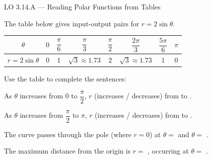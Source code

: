 \documentclass[10pt]{article}
\begin{document}
\begin{notesbox}{LO 3.14.A --- Reading Polar Functions from Tables}

The table below gives input-output pairs for $r = 2\sin\theta$.

\vspace{4pt}
\renewcommand{\arraystretch}{1.5}
\begin{tabular}{|c|c|c|c|c|c|c|c|}
\hline
$\theta$ & $0$ & $\dfrac{\pi}{6}$ & $\dfrac{\pi}{3}$ & $\dfrac{\pi}{2}$ &
           $\dfrac{2\pi}{3}$ & $\dfrac{5\pi}{6}$ & $\pi$ \\
\hline
$r = 2\sin\theta$ & $0$ & $1$ & $\sqrt{3} \approx 1.73$ & $2$ &
                   $\sqrt{3} \approx 1.73$ & $1$ & $0$ \\
\hline
\end{tabular}

\vspace{8pt}
Use the table to complete the sentences:

\vspace{4pt}
As $\theta$ increases from $0$ to $\dfrac{\pi}{2}$, $r$
\underline{\hspace{2.5cm}} (increases / decreases) from
\underline{\hspace{0.8cm}} to \underline{\hspace{0.8cm}}.

\vspace{4pt}
As $\theta$ increases from $\dfrac{\pi}{2}$ to $\pi$, $r$
\underline{\hspace{2.5cm}} (increases / decreases) from
\underline{\hspace{0.8cm}} to \underline{\hspace{0.8cm}}.

\vspace{4pt}
The curve passes through the pole (where $r = 0$) at $\theta = $
\underline{\hspace{1cm}} and $\theta = $ \underline{\hspace{1cm}}.

\vspace{4pt}
The maximum distance from the origin is $r = $ \underline{\hspace{1cm}},
occurring at $\theta = $ \underline{\hspace{1.5cm}}.

\end{notesbox}
\end{document}
